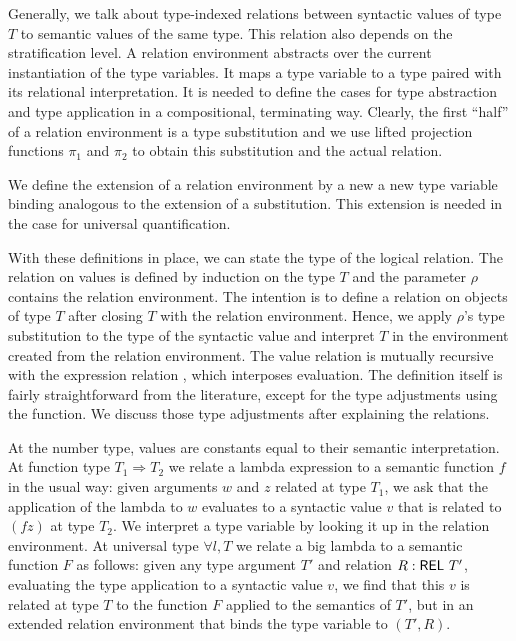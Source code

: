 \documentclass[acmsmall,anonymous,review,screen]{acmart}
\begin{document}
Generally, we talk about type-indexed relations {\AREL} between syntactic values of type $T$ to semantic values of the same
type. This relation also depends on the stratification level.
\LogicalREL
A relation environment {\ARelEnv} abstracts over the current instantiation of the
type variables. It maps a type variable to a
type paired with its relational interpretation.  It is needed to
define the cases for type abstraction and type application in a
compositional, terminating way.
\LogicalRelEnv
Clearly, the first ``half'' of a relation environment is a type
substitution and we use lifted projection functions $\pi_1$ and $\pi_2$ to obtain this
substitution and the actual relation.

We define the extension of a relation environment by a new a new type
variable binding analogous to the extension
of a substitution. This extension is needed in the case for universal
quantification.
\LogicalREext

With these definitions in place, we can state the type of the logical relation.
\LogicalMCVType
The  relation {\AVSem} on values is defined by induction on the type $T$ and the parameter
$\rho$ contains the relation environment. The intention is to define a
relation on objects of type $T$ after closing $T$ with the relation
environment. Hence, we apply $\rho$'s type substitution to the type of
the syntactic value and interpret $T$ in the environment created from
the relation environment.
The value relation is mutually recursive with the expression relation
{\AESem}, which interposes evaluation.
\LogicalMCVBody
The definition itself is fairly straightforward from the literature,
except for the type adjustments using the {\Asubst} function. We
discuss those type adjustments after explaining the relations.

At the number type, values are constants equal to their semantic
interpretation. 
 At function type $T_1 \Rightarrow T_2$ we relate a lambda expression
to a semantic function $f$ in
the usual way: given arguments $w$ and $z$ related at type $T_1$, we ask that the
application of the lambda to $w$ evaluates to a syntactic value $v$ that is
related to $(f z)$ at type $T_2$.
We interpret a type variable by looking it up in the relation
environment.
At universal type $\forall l, T$ we relate a big lambda to a semantic
function $F$ as follows: given any type argument $T'$ and relation $R :
\AREL\ T'$, evaluating the type application to a syntactic value $v$,
we find that this $v$ is related at type $T$ to the
function $F$ applied to the semantics of $T'$, but in an extended
relation environment that binds the type variable to $(T', R)$.
\end{document}
